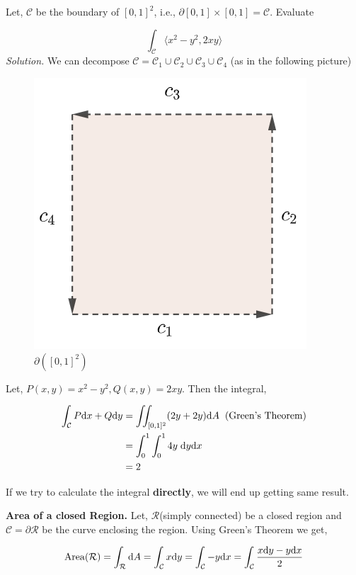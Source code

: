 \documentclass[../Analysis-3.tex]{subfiles}
\begin{document}
\begin{Eg}{}{}
  Let, $\mathcal{C}$ be the boundary of $[0,1]^2$, i.e., $\partial [0,1]\times[0,1] = \mathcal{C}$. Evaluate

  \[\int_{\mathcal{C}} \langle x^2-y^2,2xy \rangle\]
  \textit{Solution.} We can decompose $\mathcal{C} = \mathcal{C}_1 \cup \mathcal{C}_2 \cup \mathcal{C}_3 \cup \mathcal{C}_4$ (as in the following picture)

  \begin{figure}
    \centering
    \includegraphics[width=.78\linewidth]{../figures/lec-28.2.png}
    \caption{$\partial( [0,1]^2)$}
  \end{figure}

  Let, $P(x,y) = x^2 - y^2, Q(x,y) = 2xy$. Then the integral,

  \begin{align*}
    \int_{\mathcal{C}} P \dd x + Q \dd y & = \iint_{[0,1]^2} (2y + 2y) \dd A \hspace{0.2cm} \text{(Green's Theorem)} \\
                                         & = \int_{0}^1 \int_0^1 4y \hspace{0.1cm} \dd y \dd x                       \\
                                         & = 2
  \end{align*}

  If we try to calculate the integral \textbf{directly}, we will end up getting same result.
\end{Eg}

\begin{tcolorbox}
  \textbf{Area of a closed Region.} Let, $\mathcal{R}$(simply connected) be a closed region and $\mathcal{C} = \partial{\mathcal{R}}$ be the curve enclosing the region. Using Green's Theorem we get,

  \[\operatorname{Area}(\mathcal{R}) = \int_{\mathcal{R}} \dd A = \int_{\mathcal{C}} x \dd y = \int_{\mathcal{C}} -y \dd x = \int_{\mathcal{C}} \frac{x \dd y -y \dd x}{2} \]

\end{tcolorbox}
\end{document}
